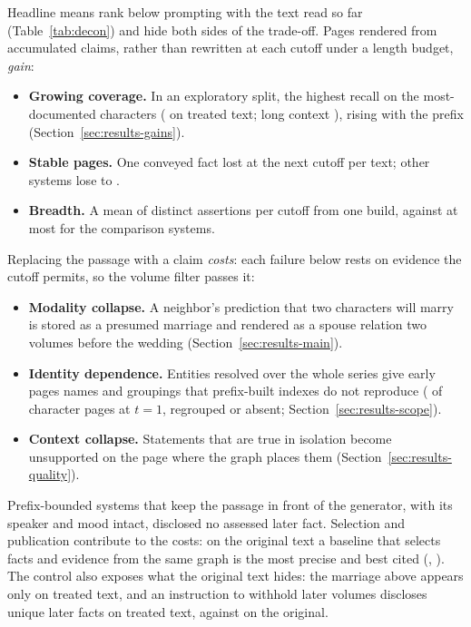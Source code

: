 Headline means rank \sys below prompting with the text read so far
(Table~\ref{tab:decon}) and hide both sides of the trade-off. Pages rendered from
accumulated claims, rather than rewritten at each cutoff under a length budget,
\emph{gain}:
\begin{itemize}[leftmargin=*,itemsep=0pt,topsep=2pt]
  \item \textbf{Growing coverage.} In an exploratory split, the highest recall on the
    most-documented characters ( on treated text; long context
    ), rising with the prefix (Section~\ref{sec:results-gains}).
  \item \textbf{Stable pages.} One conveyed fact lost at the next cutoff per text; other
    systems lose  to .
  \item \textbf{Breadth.} A mean of  distinct assertions per cutoff from
    one build, against at most  for the comparison systems.
\end{itemize}
Replacing the passage with a claim \emph{costs}: each failure below rests on evidence the
cutoff permits, so the volume filter passes it:
\begin{itemize}[leftmargin=*,itemsep=0pt,topsep=2pt]
  \item \textbf{Modality collapse.} A neighbor's prediction that two characters will marry
    is stored as a presumed marriage and rendered as a spouse relation two volumes before
    the wedding (Section~\ref{sec:results-main}).
  \item \textbf{Identity dependence.} Entities resolved over the whole series give early
    pages names and groupings that prefix-built indexes do not reproduce
    ( of character pages at $t=1$,  regrouped
    or absent; Section~\ref{sec:results-scope}).
  \item \textbf{Context collapse.} Statements that are true in isolation become unsupported
    on the page where the graph places them (Section~\ref{sec:results-quality}).
\end{itemize}
Prefix-bounded systems that keep the passage in front of the generator, with its speaker
and mood intact, disclosed no assessed later fact. Selection and publication contribute to
the costs: on the original text a baseline that selects facts and evidence from the same
graph is the most precise and best cited (, ). The control also exposes what the
original text hides: the marriage above appears only on treated text, and an instruction
to withhold later volumes discloses  unique later facts on treated
text, against  on the original.

